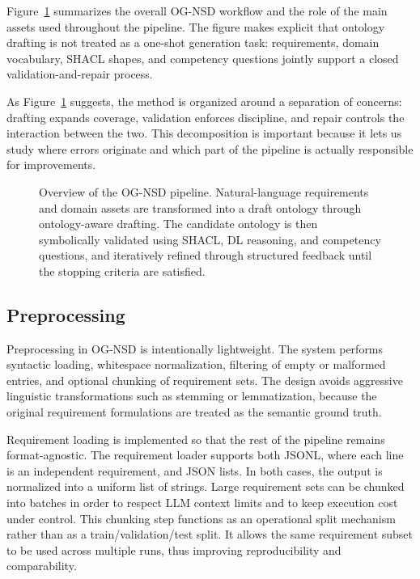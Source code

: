 Figure~\ref{fig:pipeline} summarizes the overall OG-NSD workflow and the role of the main assets used throughout the pipeline. The figure makes explicit that ontology drafting is not treated as a one-shot generation task: requirements, domain vocabulary, SHACL shapes, and competency questions jointly support a closed validation-and-repair process.

As Figure~\ref{fig:pipeline} suggests, the method is organized around a separation of concerns: drafting expands coverage, validation enforces discipline, and repair controls the interaction between the two. This decomposition is important because it lets us study where errors originate and which part of the pipeline is actually responsible for improvements.

\begin{figure}[t]
  \centering
  \resizebox{\textwidth}{!}{}
  \caption{Overview of the OG-NSD pipeline. Natural-language requirements and domain assets are transformed into a draft ontology through ontology-aware drafting. The candidate ontology is then symbolically validated using SHACL, DL reasoning, and competency questions, and iteratively refined through structured feedback until the stopping criteria are satisfied.}
  \label{fig:pipeline}
\end{figure}

\subsection{Preprocessing}
Preprocessing in OG-NSD is intentionally lightweight. The system performs syntactic loading, whitespace normalization, filtering of empty or malformed entries, and optional chunking of requirement sets. The design avoids aggressive linguistic transformations such as stemming or lemmatization, because the original requirement formulations are treated as the semantic ground truth.

Requirement loading is implemented so that the rest of the pipeline remains format-agnostic. The requirement loader supports both JSONL, where each line is an independent requirement, and JSON lists. In both cases, the output is normalized into a uniform list of strings. Large requirement sets can be chunked into batches in order to respect LLM context limits and to keep execution cost under control. This chunking step functions as an operational split mechanism rather than as a train/validation/test split. It allows the same requirement subset to be used across multiple runs, thus improving reproducibility and comparability.

